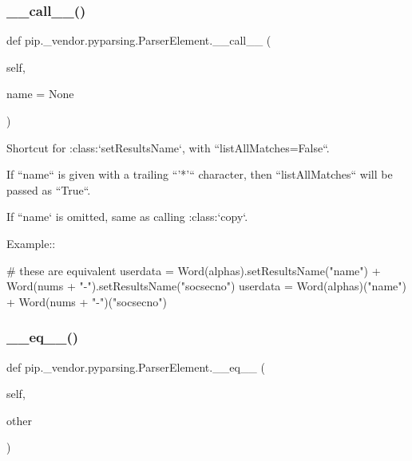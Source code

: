 \subsubsection{\texorpdfstring{\+\_\+\+\_\+call\+\_\+\+\_\+()}{\_\_call\_\_()}}
{\footnotesize\ttfamily def pip.\+\_\+vendor.\+pyparsing.\+Parser\+Element.\+\_\+\+\_\+call\+\_\+\+\_\+ (\begin{DoxyParamCaption}\item[{}]{self,  }\item[{}]{name = {\ttfamily None} }\end{DoxyParamCaption})}

\begin{DoxyVerb}Shortcut for :class:`setResultsName`, with ``listAllMatches=False``.

If ``name`` is given with a trailing ``'*'`` character, then ``listAllMatches`` will be
passed as ``True``.

If ``name` is omitted, same as calling :class:`copy`.

Example::

    # these are equivalent
    userdata = Word(alphas).setResultsName("name") + Word(nums + "-").setResultsName("socsecno")
    userdata = Word(alphas)("name") + Word(nums + "-")("socsecno")
\end{DoxyVerb}
 \mbox{\label{classpip_1_1__vendor_1_1pyparsing_1_1ParserElement_aabf2e6921a834539711aa145b69ab91b}} 
\subsubsection{\texorpdfstring{\+\_\+\+\_\+eq\+\_\+\+\_\+()}{\_\_eq\_\_()}}
{\footnotesize\ttfamily def pip.\+\_\+vendor.\+pyparsing.\+Parser\+Element.\+\_\+\+\_\+eq\+\_\+\+\_\+ (\begin{DoxyParamCaption}\item[{}]{self,  }\item[{}]{other }\end{DoxyParamCaption})}

\mbox{\label{classpip_1_1__vendor_1_1pyparsing_1_1ParserElement_a907ddc568c6ae9a077dc91780bf01323}} 
